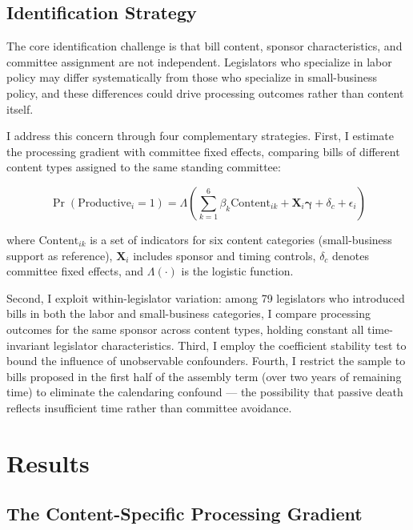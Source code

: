 \documentclass[11pt]{article}
\begin{document}
\subsection{Identification Strategy}

The core identification challenge is that bill content, sponsor characteristics, and committee assignment are not independent. Legislators who specialize in labor policy may differ systematically from those who specialize in small-business policy, and these differences could drive processing outcomes rather than content itself.

I address this concern through four complementary strategies. First, I estimate the processing gradient with committee fixed effects, comparing bills of different content types assigned to the same standing committee:

\begin{equation}
\Pr(\text{Productive}_i = 1) = \Lambda\left(\sum_{k=1}^{6} \beta_k \text{Content}_{ik} + \mathbf{X}_i \boldsymbol{\gamma} + \delta_c + \epsilon_i\right)
\label{eq:main}
\end{equation}

\noindent where $\text{Content}_{ik}$ is a set of indicators for six content categories (small-business support as reference), $\mathbf{X}_i$ includes sponsor and timing controls, $\delta_c$ denotes committee fixed effects, and $\Lambda(\cdot)$ is the logistic function.

Second, I exploit within-legislator variation: among 79 legislators who introduced bills in both the labor and small-business categories, I compare processing outcomes for the same sponsor across content types, holding constant all time-invariant legislator characteristics. Third, I employ the \citet{oster2019} coefficient stability test to bound the influence of unobservable confounders. Fourth, I restrict the sample to bills proposed in the first half of the assembly term (over two years of remaining time) to eliminate the calendaring confound --- the possibility that passive death reflects insufficient time rather than committee avoidance.

\section{Results}
\label{sec:results}

\subsection{The Content-Specific Processing Gradient}
\end{document}
